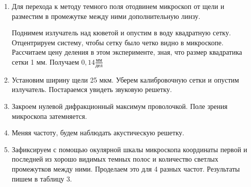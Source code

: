 \documentclass[a4paper,12pt]{article} %
\begin{document}
	\begin{enumerate}
		\item Для перехода к методу темного поля отодвинем микроскоп от щели и разместим в промежутке между ними дополнительную линзу.
		
		Поднимем излучатель над кюветой и опустим в воду квадратную сетку. Отцентрируем систему, чтобы сетку было четко видно в микроскопе. Рассчитаем цену деления в этом эксперименте, зная, что размер квадратика сетки 1 мм. Получаем $\boxed{0,14 \frac{\text{мм}}{\text{дел}}}$
		
		
		\item Установим ширину щели 25 мкм. Уберем калибровочную сетки и опустим излучатель. Постараемся увидеть звуковую решетку.
		
		\item Закроем нулевой дифракционный максимум проволочкой. Поле зрения микроскопа затемняется.
		
		\item Меняя частоту, будем наблюдать акустическую решетку.
		
		\item Зафиксируем с помощью окулярной шкалы микроскопа координаты первой и последней из хорошо видимых темных полос и количество светлых промежутков между ними. Проделаем это для 4 разных частот. Результаты пишем в таблицу 3.
		

\end{enumerate}
\end{document}
